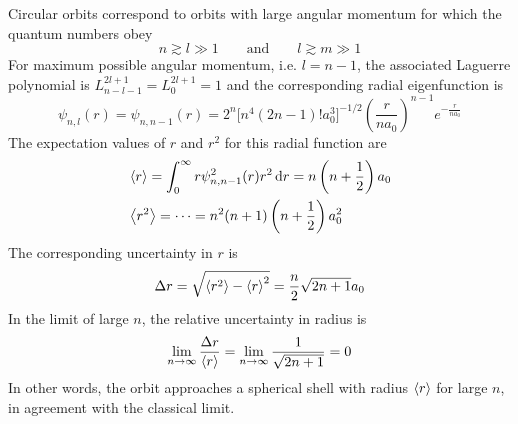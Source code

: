 \documentclass[11pt, a4paper]{article}
\newcommand{\diff}{\mathop{}\!\mathrm{d}} %
\newcommand{\eqtext}[1]{\qquad \text{#1} \qquad}
\newcommand{\p}{\psi}  %
\begin{document}
\begin{itemize}
	Circular orbits correspond to orbits with large angular momentum for which the quantum numbers obey
	\begin{equation*}
		n \gtrsim l \gg 1 \eqtext{and} l \gtrsim m \gg 1
	\end{equation*}
	For maximum possible angular momentum, i.e. $ l = n - 1 $, the associated Laguerre polynomial is $ L_{n - l - 1}^{2l + 1} = L_{0}^{2l + 1} = 1 $ and the corresponding radial eigenfunction is
	\begin{equation*}
		\p_{n, l}(r) = \p_{n, n-1}(r) = 2^{n}\big[n^{4}(2n-1)!a_{0}^{3}\big]^{-1/2}\left(\frac{r}{na_{0}}\right)^{n-1}e^{-\frac{r}{na_{0}}}
	\end{equation*}
	The expectation values of $ r $ and $ r^{2} $ for this radial function are
	\begin{align*}
		& \ev{r} = \int_{0}^{\infty}r \p_{n, n-1}^{2}(r)r^{2}\diff r = n\left(n+\frac{1}{2}\right)a_{0}\\
		& \ev{r^{2}} = \cdots =  n^{2}(n+1)\left(n + \frac{1}{2}\right)a_{0}^{2}
	\end{align*}
	The corresponding uncertainty in $ r $ is
	\begin{equation*}
		\Delta r = \sqrt{\ev{r^{2}} - \ev{r}^{2}} = \frac{n}{2}\sqrt{2n + 1}a_{0}
	\end{equation*}
	In the limit of large $ n $, the relative uncertainty in radius is
	\begin{equation*}
		\lim_{n \to \infty} \frac{\Delta r}{\ev{r}} = \lim_{n \to \infty} \frac{1}{\sqrt{2n + 1}} = 0
	\end{equation*}
	In other words, the orbit approaches a spherical shell with radius $ \ev{r} $ for large $ n $, in agreement with the classical limit.
	
\end{itemize}
\end{document}
